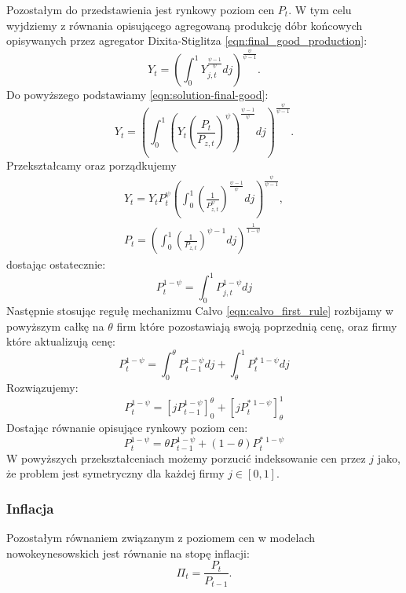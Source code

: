 Pozostałym do przedstawienia jest rynkowy poziom cen $P_{t}$. W tym celu wyjdziemy z równania opisującego agregowaną produkcję dóbr końcowych opisywanych przez agregator Dixita-Stiglitza \eqref{eqn:final_good_production}:
\begin{equation}
    Y_t = \left(\int_0^1 Y_{j,t}^{\frac{\psi-1}{\psi}}dj\right)^{\frac{\psi}{\psi-1}}.
\end{equation}
Do powyższego podstawiamy \eqref{eqn:solution-final-good}:
\begin{equation}
    Y_t = \left(\int_0^1 \left(Y_t \left(\frac{P_t}{P_{z,t}}\right)^\psi \right)^{\frac{\psi-1}{\psi}}dj\right)^{\frac{\psi}{\psi-1}}.
\end{equation}
Przekształcamy oraz porządkujemy
\begin{gather}
    Y_t = Y_t P_t^\psi \left(\int_0^1 \left( \frac{1}{P_{z,t}^\psi} \right)^{\frac{\psi-1}{\psi}}dj\right)^{\frac{\psi}{\psi-1}}, \\
    P_t = \left(\int_0^1 \left( \frac{1}{P_{z,t}} \right)^{\psi-1}dj\right)^{\frac{1}{1-\psi}}
\end{gather}
dostając ostatecznie:
\begin{equation}
    P_t^{1-\psi} = \int_0^1 P_{j,t}^{1-\psi}dj
\end{equation}
Następnie stosując regułę mechanizmu Calvo \eqref{eqn:calvo_first_rule} rozbijamy w powyższym całkę na $\theta$ firm które pozostawiają swoją poprzednią cenę, oraz firmy które aktualizują cenę:
\begin{equation}
    P_t^{1-\psi} = \int_0^\theta P_{t-1}^{1-\psi}dj + \int_\theta^1 P_{t}^{*\;1-\psi}dj
\end{equation}
Rozwiązujemy:
\begin{equation}
    P_t^{1-\psi} = \left[j P_{t-1}^{1-\psi}\right]_0^\theta + \left[j P_{t}^{*\;1-\psi}\right]_\theta^1
\end{equation}
Dostając równanie opisujące rynkowy poziom cen:
\begin{equation}
    P_t^{1-\psi} = \theta P_{t-1}^{1-\psi} + (1-\theta) P_{t}^{*\;1-\psi}
\end{equation}
W powyższych przekształceniach możemy porzucić indeksowanie cen przez $j$ jako, że problem jest symetryczny dla każdej firmy $j \in [0,1]$.

\subsubsection{Inflacja}
Pozostałym równaniem związanym z poziomem cen w modelach nowokeynesowskich jest równanie na stopę inflacji:
\begin{equation}
    \Pi_t = \frac{P_t}{P_{t-1}}.
\end{equation}

